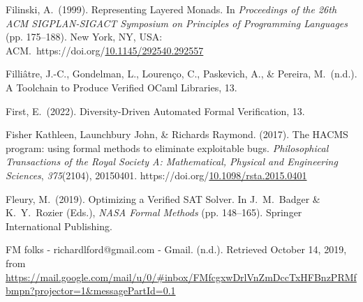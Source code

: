 \documentclass[12pt,twoside]{article}
\begin{document}
{\begin{thebibliography}{1079}
\mdbibitemlabel{}Filinski, A.~(1999). Representing Layered Monads. In \emph{Proceedings of the 26th ACM SIGPLAN-SIGACT Symposium on Principles of Programming Languages} (pp. 175–188). New York, NY, USA: ACM.~https://doi.org/\href{https://dx.doi.org/10.1145/292540.292557}{10.1145/292540.292557}%

\mdbibitemlabel{}Filliâtre, J.-C., Gondelman, L., Lourenço, C., Paskevich, A., \& Pereira, M.~(n.d.). A Toolchain to Produce Verified OCaml Libraries, 13.%

\mdbibitemlabel{}First, E.~(2022). Diversity-Driven Automated Formal Verification, 13.%

\mdbibitemlabel{}Fisher Kathleen, Launchbury John, \& Richards Raymond. (2017). The HACMS program: using formal methods to eliminate exploitable bugs. \emph{Philosophical Transactions of the Royal Society A: Mathematical, Physical and Engineering Sciences}, \emph{375}(2104), 20150401. https://doi.org/\href{https://dx.doi.org/10.1098/rsta.2015.0401}{10.1098/rsta.2015.0401}%

\mdbibitemlabel{}Fleury, M.~(2019). Optimizing a Verified SAT Solver. In J.~M.~Badger \& K.~Y.~Rozier (Eds.), \emph{NASA Formal Methods} (pp. 148–165). Springer International Publishing.%

\mdbibitemlabel{}FM folks - richardlford@gmail.com - Gmail. (n.d.). Retrieved October 14, 2019, from \href{https://mail.google.com/mail/u/0/\%23inbox/FMfcgxwDrlVnZmDccTxHFBnzPRMfbmpn?projector=1\%26messagePartId=0.1}{{\ttfamily https://\hspace{0pt}mail.\hspace{0pt}google.\hspace{0pt}com/\hspace{0pt}mail/\hspace{0pt}u/\hspace{0pt}0/\#\hspace{0pt}inbox/\hspace{0pt}FMfcgxwDrlVnZmDccTxHFBnzPRMfbmpn?\hspace{0pt}projector=\hspace{0pt}1\&\hspace{0pt}messagePartId=\hspace{0pt}0.\hspace{0pt}1}}%


\end{thebibliography}}
\end{document}
